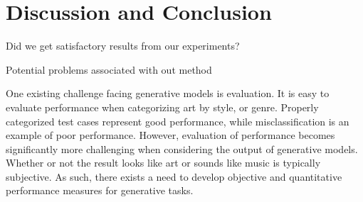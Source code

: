 \documentclass{article}
\begin{document}
\section{Discussion and Conclusion}

Did we get satisfactory results from our experiments?

Potential problems associated with out method

One existing challenge facing generative models is evaluation. It is easy to evaluate performance when categorizing art by style, or genre. Properly categorized test cases represent good performance, while misclassification is an example of poor performance. However, evaluation of performance becomes significantly more challenging when considering the output of generative models. Whether or not the result looks like art or sounds like music is typically subjective. As such, there exists a need to develop objective and quantitative performance measures for generative tasks.


\end{document}
